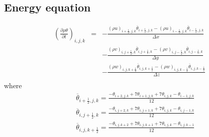 \subsection{Energy equation}

\begin{eqnarray}
\left(\frac{\partial \rho \theta}{\partial t}\right)_{i,j,k}
&=& - \frac{(\rho u)_{i+\frac{1}{2},j,k} \overline{\theta}_{i+\frac{1}{2},j,k} 
           -(\rho u)_{i-\frac{1}{2},j,k} \overline{\theta}_{i-\frac{1}{2},j,k}}
     {\Delta x}\nonumber\\
& &  - \frac{(\rho v)_{i,j+\frac{1}{2},k} \overline{\theta}_{i,j+\frac{1}{2},k} 
           -(\rho v)_{i,j-\frac{1}{2},k} \overline{\theta}_{i,j-\frac{1}{2},k}}
     {\Delta y}\nonumber\\
& &  - \frac{(\rho w)_{i,j,k+\frac{1}{2}} \overline{\theta}_{i,j,k+\frac{1}{2}} 
           -(\rho w)_{i,j,k-\frac{1}{2}} \overline{\theta}_{i,j,k-\frac{1}{2}}}
     {\Delta z}\nonumber\\
\end{eqnarray}
where
\begin{eqnarray}
&& \overline{\theta}_{i+\frac{1}{2},j,k} = 
\frac{-\theta_{i+2,j,k}+7\theta_{i+1,j,k}+7\theta_{i,j,k}-\theta_{i-1,j,k}}{12}\\
&& \overline{\theta}_{i,j+\frac{1}{2},k} = 
\frac{-\theta_{i,j+2,k}+7\theta_{i,j+1,k}+7\theta_{i,j,k}-\theta_{i,j-1,k}}{12}\\
&& \overline{\theta}_{i,j,k+\frac{1}{2}} = 
\frac{-\theta_{i,j,k+2}+7\theta_{i,j,k+1}+7\theta_{i,j,k}-\theta_{i,j,k-1}}{12}
\end{eqnarray}


